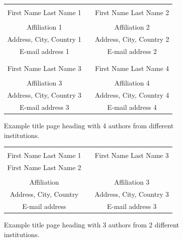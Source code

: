 \documentclass{scspaperproc}
\theoremstyle{scsthe}
\begin{document}
\begin{figure}[htb]
{
\centering
\begin{tabular}{ccc}
\phantom{Adjust spacing using these entries} & \phantom{intermediate space} & \phantom{Adjust spacing using these entries} \\
First Name Last Name 1 & & First Name Last Name 2 \\
\\
Affiliation 1 & & Affiliation 2 \\
Address, City, Country 1 & & Address, City, Country 2 \\
E-mail address 1 & & E-mail address 2 \\
\\ \\
First Name Last Name 3 & & First Name Last Name 4 \\
\\
Affiliation 3 & & Affiliation 4 \\
Address, City, Country 3 & & Address, City, Country 4 \\
E-mail address 3 & & E-mail address 4 
\end{tabular}
\caption{Example title page heading with 4 authors from different institutions.\label{fig4different}}
}
\end{figure}

\begin{figure}[htb]
{
\centering
\begin{tabular}{ccc}
\phantom{Entries to adjust spacing - ignore} & \phantom{intermediate space} & \phantom{Entries to adjust spacing - ignore} \\
First Name Last Name 1 & & First Name Last Name 3 \\
First Name Last Name 2 & & \\
\\
Affiliation & & Affiliation 3 \\
Address, City, Country & & Address, City, Country 3 \\
E-mail address & & E-mail address 3 
\end{tabular}
\caption{Example title page heading with 3 authors from 2 different institutions. \label{fig2equals1different}}
}
\end{figure}
\end{document}
